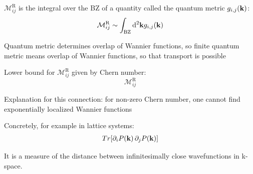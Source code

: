 \documentclass[aspectratio=169]{beamer}
\begin{document}
\begin{frame}
	\(\mathcal{M}_{ij}^{\textrm{R}}\) is the integral over the BZ of a quantity called the quantum metric \(g_{i, j} (\mathbf{k})\):
	\begin{equation}
		\mathcal{M}_{ij}^{\textrm{R}} \sim \int_{\textrm{BZ}} \odif[order=2]{\vb{k}} g_{i, j} (\vb{k})
	\end{equation}
	
	Quantum metric determines overlap of Wannier functions, so finite quantum metric means overlap of Wannier functions, so that transport is possible
	
	Lower bound for \(\mathcal{M}_{ij}^{\textrm{R}}\) given by Chern number:
	\begin{equation}
		\mathcal{M}_{ij}^{\textrm{R}}
	\end{equation}
	
	Explanation for this connection: for non-zero Chern number, one cannot find exponentially localized Wannier functions
\end{frame}

\begin{frame}
	Concretely, for example in lattice systems:
	\begin{align}
		Tr{\left[\pdif{i} P(\vb{k}) \pdif{j} P(\vb{k}) \right]} 
	\end{align}
	
	It is a measure of the distance between infinitesimally close wavefunctions in k-space.
\end{frame}
\end{document}
